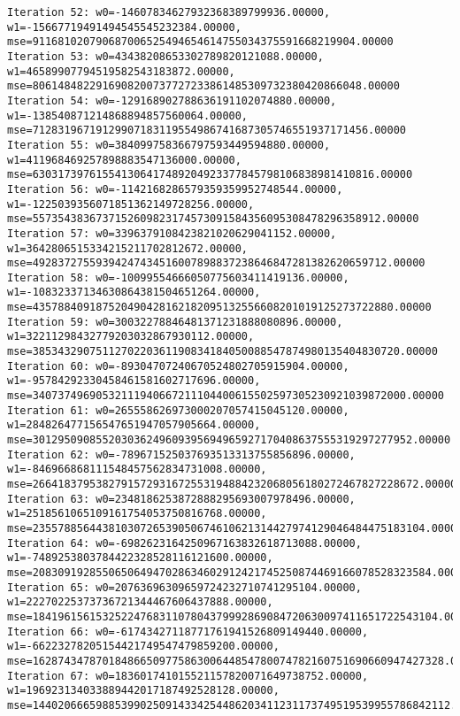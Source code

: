 \documentclass[11pt]{article}
\begin{document}
\begin{Verbatim}[commandchars=\\\{\}]
Iteration 52: w0=-14607834627932368389799936.00000, w1=-15667719491494545545232384.00000, mse=911681020790687006525494654614755034375591668219904.00000
Iteration 53: w0=43438208653302789820121088.00000, w1=46589907794519582543183872.00000, mse=8061484822916908200737727233861485309732380420866048.00000
Iteration 54: w0=-129168902788636191102074880.00000, w1=-138540871214868894857560064.00000, mse=71283196719129907183119554986741687305746551937171456.00000
Iteration 55: w0=384099758366797593449594880.00000, w1=411968469257898883547136000.00000, mse=630317397615541306417489204923377845798106838981410816.00000
Iteration 56: w0=-1142168286579359359952748544.00000, w1=-1225039356071851362149728256.00000, mse=5573543836737152609823174573091584356095308478296358912.00000
Iteration 57: w0=3396379108423821020629041152.00000, w1=3642806515334215211702812672.00000, mse=49283727559394247434516007898837238646847281382620659712.00000
Iteration 58: w0=-10099554666050775603411419136.00000, w1=-10832337134630864381504651264.00000, mse=435788409187520490428162182095132556608201019125273722880.00000
Iteration 59: w0=30032278846481371231888080896.00000, w1=32211298432779203032867930112.00000, mse=3853432907511270220361190834184050088547874980135404830720.00000
Iteration 60: w0=-89304707240670524802705915904.00000, w1=-95784292330458461581602717696.00000, mse=34073749690532111940667211104400615502597305230921039872000.00000
Iteration 61: w0=265558626973000207057415045120.00000, w1=284826477156547651947057905664.00000, mse=301295090855203036249609395694965927170408637555319297277952.00000
Iteration 62: w0=-789671525037693513313755856896.00000, w1=-846966868111548457562834731008.00000, mse=2664183795382791572931672553194884232068056180272467827228672.00000
Iteration 63: w0=2348186253872888295693007978496.00000, w1=2518561065109161754053750816768.00000, mse=23557885644381030726539050674610621314427974129046484475183104.00000
Iteration 64: w0=-6982623164250967163832618713088.00000, w1=-7489253803784422328528116121600.00000, mse=208309192855065064947028634602912421745250874469166078528323584.00000
Iteration 65: w0=20763696309659724232710741295104.00000, w1=22270225373736721344467606437888.00000, mse=1841961561532522476831107804379992869084720630097411651722543104.00000
Iteration 66: w0=-61743427118771761941526809149440.00000, w1=-66223278205154421749547479859200.00000, mse=16287434787018486650977586300644854780074782160751690660947427328.00000
Iteration 67: w0=183601741015521157820071649738752.00000, w1=196923134033889442017187492528128.00000, mse=144020666598853990250914334254486203411231173749519539955786842112.00000

\end{Verbatim}
\end{document}
